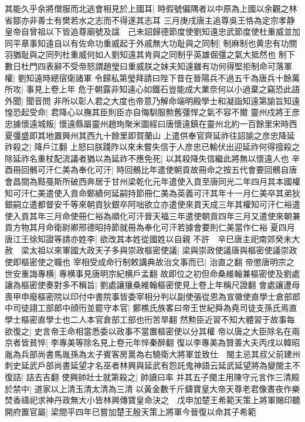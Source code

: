 其能久乎余將僧服而北逃會相見於上國耳|{
	時假號偏隅者以中原為上國以余觀之林省鄒亦非善士有樊若水之志而不得遂其志耳}
三月庚戌唐主追尊吳王恪為定宗孝静皇帝自曾祖以下皆追尊廟號及諡　己未詔歸德節度使劉知遠忠武節度使杜重威並加同平章事知遠自以有佐命功重威起于外戚無大功耻與之同制|{
	制麻制也黄忠有功關羽猶耻與之同列杜重威何如人劉知遠其肯與之同制乎英雄倔彊之氣大抵然也}
制下數日杜門四表辭不受帝怒謂趙瑩曰重威朕之妹夫知遠雖有功何得堅拒制命可落軍權|{
	劉知遠時總宿衛諸軍}
令歸私第瑩拜請曰陛下昔在晉陽兵不過五千為唐兵十餘萬所攻|{
	事見上卷上年}
危于朝露非知遠心如鐵石豈能成大業奈何以小過棄之竊恐此語外聞|{
	聞音問}
非所以彰人君之大度也帝意乃解命端明殿學士和凝詣知遠第諭旨知遠惶恐起受命|{
	君降心以撫其臣則臣亦自悔馴服勲舊彊悍之氣不容不爾}
靈州戍將王彦忠據懷遠城叛|{
	懷遠縣屬靈州趙珣聚米圖經曰唐懷遠鎮在靈州北約一百餘里宋時西夏彊盛即其地置興州其西九十餘里即賀蘭山}
上遣供奉官齊延祚往詔諭之彦忠降延祚殺之|{
	降戶江翻}
上怒曰朕踐阼以來未嘗失信于人彦忠已輸伏出迎延祚何得擅殺之除延祚名重杖配流議者猶以為延祚不應免死|{
	以其殺降失信繼此將無以懷遠人也}
辛酉冊回鶻可汗仁美為奉化可汗|{
	時回鶻比年遣使朝貢故冊命之按五代會要回鶻自唐會昌間為黠戞斯所破西奔居于甘州梁乾化元年遣使入貢至唐同光二年四月其本國權知可汗仁美遣使入貢命鄭績何延嗣持節冊仁美為英義可汗其年十一月仁美卒其弟狄銀嗣立遣都督安千等來朝貢狄銀卒阿咄欲立亦遣使來貢天成三年其權知可汗仁裕遣使入貢其年三月命使冊仁裕為順化可汗晉天福三年遣使朝貢四年三月又遣使來朝兼貢方物其月命衛尉卿邢德昭持節就冊為奉化可汗若據會要則仁美當作仁裕}
夏四月唐江王徐知證等請亦姓李|{
	欲改其本姓從國姓以自親}
不許　辛巳唐主祀南郊癸未大赦　梁太祖以來軍國大政天子多與崇政樞密使議|{
	梁與崇政使議唐與樞密使議崇政使即樞密使之職也}
宰相受成命行制敕講典故治文事而已|{
	治直之翻}
帝懲唐明宗之世安重誨專横|{
	專横事見唐明宗紀横戶孟翻}
故即位之初但命桑維翰兼樞密使及劉處讓為樞密使奏對多不稱旨|{
	劉處讓攘桑維翰樞密使見上卷上年稱尺證翻}
會處讓遭母喪甲申廢樞密院以印付中書院事皆委宰相分判以副使張從恩為宣徽使直學士倉部郎中司徒詡工部郎中顔衎並罷守本官|{
	鄭樵氏族畧曰帝王世紀舜為堯司徒支孫氏焉直學士樞密直學士也二人本官倉部工部也衎苦旱翻}
然勲臣近習不知大體習于故事每欲復之|{
	史言帝王命相當悉委以政事不當置樞密使以分其權}
帝以唐之大臣除名在兩京者皆貧悴|{
	李專美等除名見上卷元年悴秦醉翻}
復以李專美為贊善大夫丙戌以韓昭胤為兵部尚書馬胤孫為太子賓客房暠為右驍衛大將軍並致仕　閩主忌其叔父前建州刺史延武戶部尚書延望才名巫者林興與延武有怨託鬼神語云延武延望將為變閩主不復詰|{
	詰去吉翻}
使興帥壯士就第殺之|{
	帥讀曰率}
并其五子閩主用陳守元言作三清殿於禁中|{
	道家以上清玉清太清為三清}
以黃金數千斤鑄寶皇大帝天尊老君像晝夜作樂焚香禱祀求神丹政無大小皆林興傳寶皇命決之　戊申加楚王希範天策上將軍賜印聽開府置官屬|{
	梁間平四年已嘗加楚王殷天策上將軍今晉復以命其子希範}
